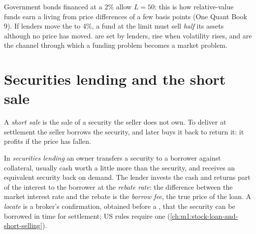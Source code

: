 \begin{example}\label{ex:m1:financing:doubling}
Government bonds financed at a 2\%  allow $L = 50$: this is how
relative-value funds earn a living from price differences of a few basis
points (One Quant Book 9). If lenders move the  to 4\%, a fund at the
limit must sell \emph{half} its assets although no price has moved. 
are set by lenders, rise when volatility rises, and are the channel through
which a funding problem becomes a market problem.
\end{example}

\section{Securities lending and the short sale}

\begin{definition}\label{def:m1:financing:short}
A \emph{short sale} is the sale of a security the seller
does not own. To deliver at settlement the seller borrows the security, and
later buys it back to return it: it profits if the price has fallen.
\end{definition}

\begin{definition}\label{def:m1:financing:seclending}
In \emph{securities lending} an owner transfers a
security to a borrower against collateral, usually cash worth a little more
than the security, and receives an equivalent security back on demand. The
lender invests the cash and returns part of the interest to the borrower at
the \emph{rebate rate}: the difference between the market
interest rate and the rebate is the \emph{borrow fee}, the true price of the
loan. A \emph{locate} is a broker's confirmation, obtained
before a , that the security can be borrowed in time for
settlement; US rules require one (\cref{ch:m1:stock-loan-and-short-selling}).
\end{definition}


